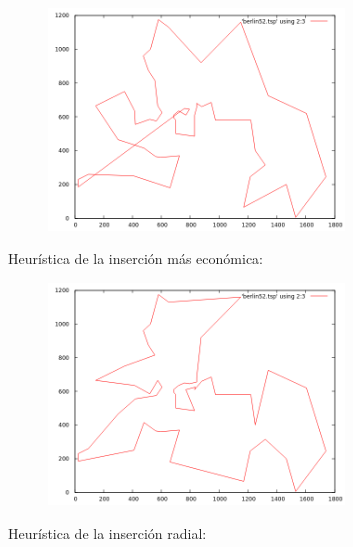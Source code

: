 \documentclass[11pt,a4paper]{article}
\begin{document}
				\begin{figure}[h]

					\centering
					\includegraphics[width=0.7\textwidth]{berlin52VMC.png}
					
				\end{figure}

				\par
				Heurística de la inserción más económica:

				\vspace{5mm}

				\begin{figure}[h]

					\centering
					\includegraphics[width=0.7\textwidth]{berlin52IM.png}
					
				\end{figure}

\newpage

				\par
				Heurística de la inserción radial:

				\vspace{5mm}
\end{document}
